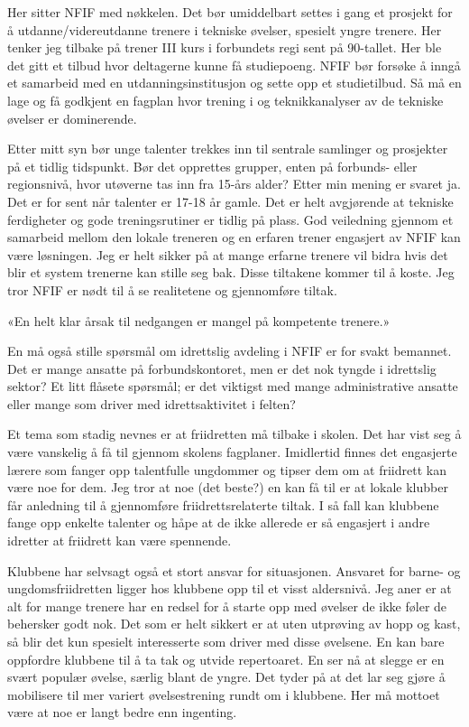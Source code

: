 Her sitter NFIF med nøkkelen. Det bør umiddelbart settes i gang et prosjekt for å utdanne/videreutdanne trenere i tekniske øvelser, spesielt yngre trenere. Her tenker jeg tilbake på trener III kurs i forbundets regi sent på 90-tallet. Her ble det gitt et tilbud hvor deltagerne kunne få studiepoeng. NFIF bør forsøke å inngå et samarbeid med en utdanningsinstitusjon og sette opp et studietilbud. Så må en lage og få godkjent en fagplan hvor trening i og teknikkanalyser av de tekniske øvelser er dominerende.

Etter mitt syn bør unge talenter trekkes inn til sentrale samlinger og prosjekter på et tidlig tidspunkt. Bør det opprettes grupper, enten på forbunds- eller regionsnivå, hvor utøverne tas inn fra 15-års alder? Etter min mening er svaret ja. Det er for sent når talenter er 17-18 år gamle. Det er helt avgjørende at tekniske ferdigheter og gode treningsrutiner er tidlig på plass. God veiledning gjennom et samarbeid mellom den lokale treneren og en erfaren trener engasjert av NFIF kan være løsningen. Jeg er helt sikker på at mange erfarne trenere vil bidra hvis det blir et system trenerne kan stille seg bak. Disse tiltakene kommer til å koste. Jeg tror NFIF er nødt til å se realitetene og gjennomføre tiltak.

\begin{sitat}

«En helt klar årsak til nedgangen er mangel på kompetente trenere.»

\end{sitat}

En må også stille spørsmål om idrettslig avdeling i NFIF er for svakt bemannet. Det er mange ansatte på forbundskontoret, men er det nok tyngde i idrettslig sektor? Et litt flåsete spørsmål; er det viktigst med mange administrative ansatte eller mange som driver med idrettsaktivitet i felten?

Et tema som stadig nevnes er at friidretten må tilbake i skolen. Det har vist seg å være vanskelig å få til gjennom skolens fagplaner. Imidlertid finnes det engasjerte lærere som fanger opp talentfulle ungdommer og tipser dem om at friidrett kan være noe for dem. Jeg tror at noe (det beste?) en kan få til er at lokale klubber får anledning til å gjennomføre friidrettsrelaterte tiltak. I så fall kan klubbene fange opp enkelte talenter og håpe at de ikke allerede er så engasjert i andre idretter at friidrett kan være spennende.

Klubbene har selvsagt også et stort ansvar for situasjonen. Ansvaret for barne- og ungdomsfriidretten ligger hos klubbene opp til et visst aldersnivå. Jeg aner er at alt for mange trenere har en redsel for å starte opp med øvelser de ikke føler de behersker godt nok. Det som er helt sikkert er at uten utprøving av hopp og kast, så blir det kun spesielt interesserte som driver med disse øvelsene. En kan bare oppfordre klubbene til å ta tak og utvide repertoaret. En ser nå at slegge er en svært populær øvelse, særlig blant de yngre. Det tyder på at det lar seg gjøre å mobilisere til mer variert øvelsestrening rundt om i klubbene. Her må mottoet være at noe er langt bedre enn ingenting.

